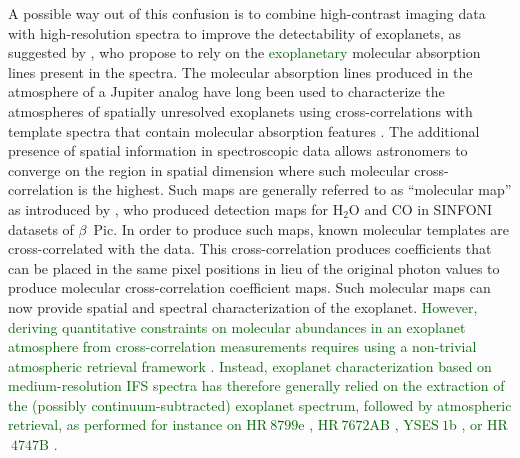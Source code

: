 \documentclass[referee]{aa} %
\newcommand{\newchange}[1]{\textcolor{darkgreen}{#1}}
\begin{document}
A possible way out of this confusion is %
to combine high-contrast imaging data with high-resolution spectra to improve the detectability of exoplanets, as suggested by \citet{2015Snellen}, who propose to rely on the \newchange{exoplanetary} molecular absorption lines present in the spectra.
The molecular absorption lines produced in the atmosphere of a Jupiter analog have long been used to characterize the atmospheres of spatially unresolved exoplanets using cross-correlations with template spectra \cite[e.g.,][]{snellen2010orbital,birkby2013detection} that contain molecular absorption features \citep[e.g.,][]{2003BTsettl}.
The additional presence of spatial information in spectroscopic data allows astronomers to converge on the region in spatial dimension where such molecular cross-correlation is the highest.
Such maps are generally referred to as ``molecular map'' as introduced by \citet{2018AHoeijmakersMM}, who produced detection maps for \rm{H$_2$O} and \rm{CO} in SINFONI datasets of $\beta$~Pic.
In order to produce such maps, known molecular templates are cross-correlated with the data.
This cross-correlation produces coefficients that can be placed in the same pixel positions in lieu of the original photon values to produce molecular cross-correlation coefficient maps.
Such molecular maps can now provide spatial and spectral characterization of the exoplanet.
\newchange{However, deriving quantitative constraints on molecular abundances in an exoplanet atmosphere from cross-correlation measurements requires using a non-trivial atmospheric retrieval framework \citep{Brogi2019}. Instead, exoplanet characterization based on medium-resolution IFS spectra has therefore generally relied on the extraction of the (possibly continuum-subtracted) exoplanet spectrum, followed by atmospheric retrieval, as performed for instance on HR$~8799$e \citep[][]{2020MolliereHR8799e}, HR$~7672$AB \citep[][]{2022WangHR7672AB}, YSES$~1$b \citep[][]{2022Zhang}, or HR$~4747$B \citep[][]{2022Xuan4747B}.}
\end{document}
